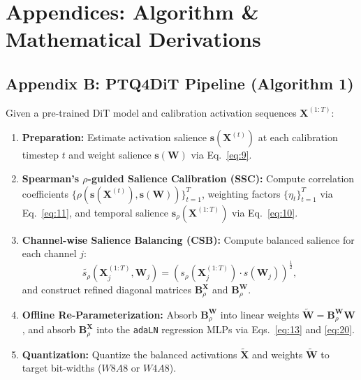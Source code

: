 \documentclass[10pt,a4paper]{article}
\begin{document}
\section*{Appendices: Algorithm \& Mathematical Derivations}

\subsection*{Appendix B: PTQ4DiT Pipeline (Algorithm 1)}
Given a pre-trained DiT model and calibration activation sequences $\mathbf{X}^{(1:T)}$:
\begin{enumerate}
    \item \textbf{Preparation:} Estimate activation salience $\mathbf{s}(\mathbf{X}^{(t)})$ at each calibration timestep $t$ and weight salience $\mathbf{s}(\mathbf{W})$ via Eq.~\ref{eq:9}.
    \item \textbf{Spearman's $\rho$-guided Salience Calibration (SSC):} Compute correlation coefficients $\{\rho(\mathbf{s}(\mathbf{X}^{(t)}), \mathbf{s}(\mathbf{W}))\}_{t=1}^T$, weighting factors $\{\eta_t\}_{t=1}^T$ via Eq.~\ref{eq:11}, and temporal salience $\mathbf{s}_\rho(\mathbf{X}^{(1:T)})$ via Eq.~\ref{eq:10}.
    \item \textbf{Channel-wise Salience Balancing (CSB):} Compute balanced salience for each channel $j$:
    \begin{equation}
    \widetilde{s_\rho}(\mathbf{X}_j^{(1:T)}, \mathbf{W}_j) = \left(s_\rho(\mathbf{X}_j^{(1:T)}) \cdot s(\mathbf{W}_j)\right)^{\frac{1}{2}},
    \label{eq:14}
    \end{equation}
    and construct refined diagonal matrices $\mathbf{B}_\rho^{\mathbf{X}}$ and $\mathbf{B}_\rho^{\mathbf{W}}$.
    \item \textbf{Offline Re-Parameterization:} Absorb $\mathbf{B}_\rho^{\mathbf{W}}$ into linear weights $\widetilde{\mathbf{W}} = \mathbf{B}_\rho^{\mathbf{W}}\mathbf{W}$, and absorb $\mathbf{B}_\rho^{\mathbf{X}}$ into the \texttt{adaLN} regression MLPs via Eqs.~\ref{eq:13} and \ref{eq:20}.
    \item \textbf{Quantization:} Quantize the balanced activations $\widetilde{\mathbf{X}}$ and weights $\widetilde{\mathbf{W}}$ to target bit-widths ($W8A8$ or $W4A8$).
\end{enumerate}
\end{document}

